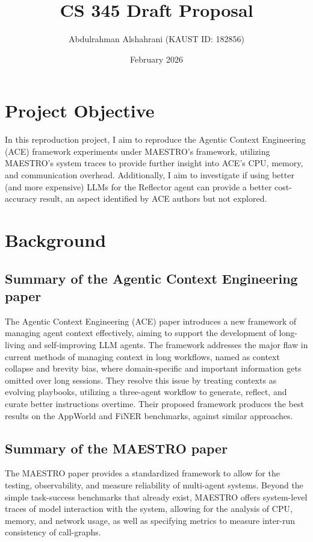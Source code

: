 \documentclass{article}
\title{CS 345 Draft Proposal}
\author{Abdulrahman Alshahrani (KAUST ID: 182856)}
\date{February 2026}
\begin{document}
\maketitle

\section{Project Objective}

In this reproduction project, I aim to reproduce the Agentic Context Engineering (ACE) framework experiments under MAESTRO's framework, utilizing MAESTRO's system traces to provide further insight into ACE's CPU, memory, and communication overhead. Additionally, I aim to investigate if using better (and more expensive) LLMs for the Reflector agent can provide a better cost-accuracy result, an aspect identified by ACE authors but not explored.

\section{Background}

\subsection{Summary of the Agentic Context Engineering paper}

The Agentic Context Engineering (ACE) paper introduces a new framework of managing agent context effectively, aiming to support the development of long-living and self-improving LLM agents. The framework addresses the major flaw in current methods of managing context in long workflows, named as context collapse and brevity bias, where domain-specific and important information gets omitted over long sessions. They resolve this issue by treating contexts as evolving playbooks, utilizing a three-agent workflow to generate, reflect, and curate better instructions overtime. Their proposed framework produces the best results on the AppWorld and FiNER benchmarks, against similar approaches.

\subsection{Summary of the MAESTRO paper}

The MAESTRO paper provides a standardized framework to allow for the testing, observability, and measure reliability of multi-agent systems. Beyond the simple task-success benchmarks that already exist, MAESTRO offers system-level traces of model interaction with the system, allowing for the analysis of CPU, memory, and network usage, as well as specifying metrics to measure inter-run consistency of call-graphs.
\end{document}
